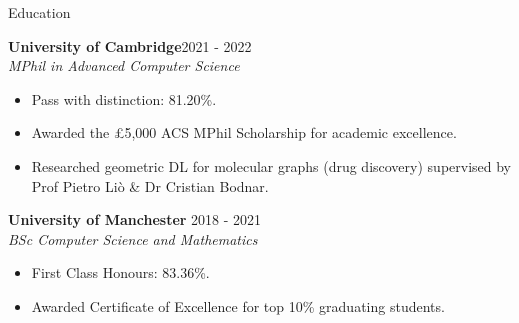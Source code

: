 \documentclass[hidelinks]{resume} %
\begin{document}
\begin{rSection}{Education}

{\textbf{University of Cambridge}\hfill {2021 - 2022}\\
\textit{MPhil in Advanced Computer Science}}
\begin{itemize}
    \item Pass with distinction: 81.20\%.
    \item Awarded the £5,000 ACS MPhil Scholarship for academic excellence.
    \item Researched geometric DL for molecular graphs (drug discovery) supervised by Prof Pietro Liò \& Dr Cristian Bodnar.
\end{itemize}

{\textbf{University of Manchester}} \hfill {2018 - 2021}\\
\textit{BSc Computer Science and Mathematics}
\begin{itemize}
    \item First Class Honours: 83.36\%.
    \item Awarded Certificate of Excellence for top 10\% graduating students.
\end{itemize}

\end{rSection}
% 
\end{document}
